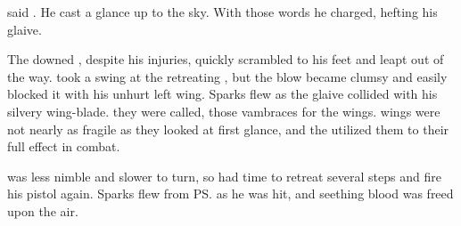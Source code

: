 \begin{garbage}
\begin{comment}
  Teshrial casts a spell. 
  A blow of entropy strikes Ishnaruchaefir's body. 
  His Xzai-Shann energy rejects the entropy, but it is costly for his body. 
  A great wound springs open and blood fountains. 
  
  But by now Ishnaruchaefir is close enough that Teshrial can't dance out of melee range. 
  So Ishnaruchaefir draws on his stamina, ignores the painful wound and presses the attack. 
  He swings the glaive directly down on Teshrial. 
  
  Teshrial brings up his senaan in a parade that is technically perfect. 
  It should deflect the glaive and place Ishnaruchaefir in an awkward position afterwards, whereas Teshrial himself would stand in an ideal position to strike. 
  
  But Teshrial has failed to take into account the sheer brute strength of the Dragonlord's attack. 
  His parade should stop any normal attack\prikker but Rystessakhin just shears straight through. 
  Teshrial's prized senaan, Turishah, just BREAKS in his hands!
  
  The glaive tears through Teshrial's right side, arm and wing. 
  He recovers from the shock and casts a spell. 
  Another bleeding wound erupts from Ishnaruchaefir's body. 
  But Ishnaruchaefir ignores the wound and strikes again. 
  Cutting through Teshrial. 
  
  Teshrial slumps back, limp. 
  His head is cloven, split down the middle. 
  He is dead. 
  
  Ishnaruchaefir addresses \Achsah. 
\end{comment}

 said \Ishnaruchaefir.  
He cast a glance up to the sky. 
With those words he charged, hefting his glaive. 

The downed \Teshrial{}, despite his injuries, quickly scrambled to his feet and leapt out of the way. 
\Ishnaruchaefir{} took a swing at the retreating \resphan, but the blow became clumsy and \Teshrial{} easily blocked it with his unhurt left wing. 
Sparks flew as the glaive collided with his silvery wing-blade. 
\index{\kilghan}%
%
\emph{} they were called, those vambraces for the wings. 
\Resphan{} wings were not nearly as fragile as they looked at first glance, and the \resphain{} utilized them to their full effect in combat. 

\Ishnaruchaefir{} was less nimble and slower to turn, so \Teshrial{} had time to retreat several steps and fire his pistol again. 
Sparks flew from \ps{\Ishnaruchaefir}{} \armour as he was hit, and seething blood was freed upon the air. 


\end{garbage}
